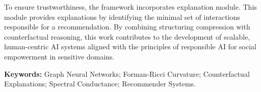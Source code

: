 \documentclass[BTech]{iiitdmdiss}
\begin{document}
To ensure trustworthiness, the framework incorporates explanation module. This module provides explanations by identifying the minimal set of interactions responsible for a recommendation. By combining structuring compression with  counterfactual reasoning, this work contributes to the development of scalable, human-centric AI systems aligned with the principles of responsible AI for social empowerment in sensitive domains.

\vspace{10pt}
\noindent \textbf{Keywords:} Graph Neural Networks; Forman-Ricci Curvature; Counterfactual Explanations; Spectral Conductance; Recommender Systems.


\pagebreak


\begin{singlespace}
\tableofcontents
\thispagestyle{empty}

\listoftables
{}
\listoffigures
{}
\end{singlespace}


\abbreviations
\end{document}
